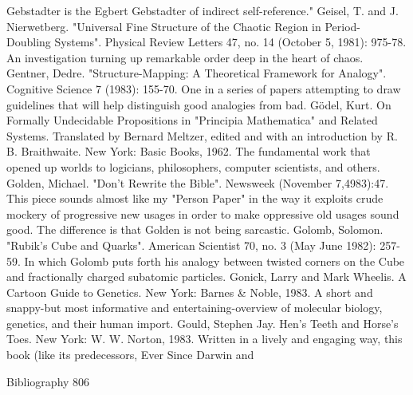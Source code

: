   Gebstadter is the Egbert Gebstadter of indirect self-reference."
Geisel, T. and J. Nierwetberg. "Universal Fine Structure of the Chaotic Region in Period-
  Doubling Systems". Physical Review Letters 47, no. 14 (October 5, 1981): 975-78. An
  investigation turning up remarkable order deep in the heart of chaos.
Gentner, Dedre. "Structure-Mapping: A Theoretical Framework for Analogy". Cognitive
  Science 7 (1983): 155-70. One in a series of papers attempting to draw guidelines that will
  help distinguish good analogies from bad.
Gödel, Kurt. On Formally Undecidable Propositions in "Principia Mathematica" and Related
  Systems. Translated by Bernard Meltzer, edited and with an introduction by R. B.
  Braithwaite. New York: Basic Books, 1962. The fundamental work that opened up worlds
  to logicians, philosophers, computer scientists, and others.
Golden, Michael. "Don't Rewrite the Bible". Newsweek (November 7,4983):47. This piece
  sounds almost like my "Person Paper" in the way it exploits crude mockery of progressive
  new usages in order to make oppressive old usages sound good. The difference is that
  Golden is not being sarcastic.
Golomb, Solomon. "Rubik's Cube and Quarks". American Scientist 70, no. 3 (May June
  1982): 257-59. In which Golomb puts forth his analogy between twisted corners on the
  Cube and fractionally charged subatomic particles.
Gonick, Larry and Mark Wheelis. A Cartoon Guide to Genetics. New York: Barnes \& Noble,
  1983. A short and snappy-but most informative and entertaining-overview of molecular
  biology, genetics, and their human import.
Gould, Stephen Jay. Hen's Teeth and Horse's Toes. New York: W. W. Norton, 1983. Written
  in a lively and engaging way, this book (like its predecessors, Ever Since Darwin and

Bibliography                                                                                806

